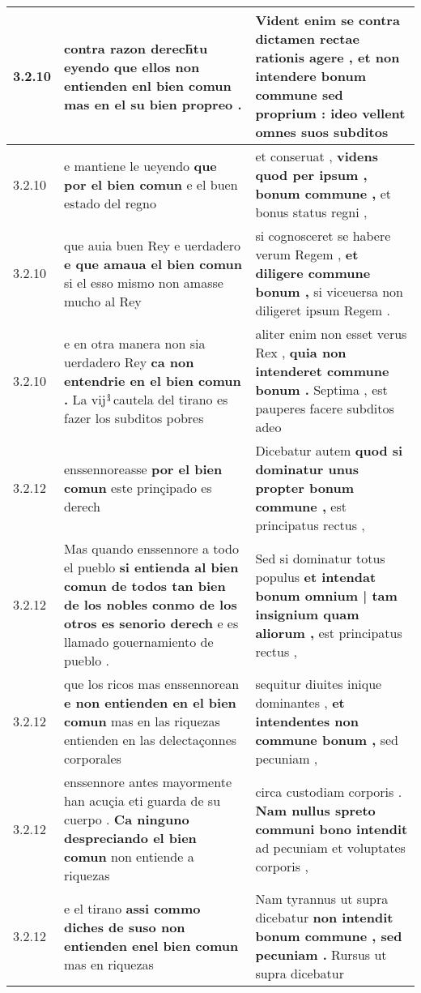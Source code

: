\begin{tabular}{|p{1cm}|p{6.5cm}|p{6.5cm}|}
3.2.10 & contra razon derech̃tu eyendo \textbf{ que ellos non entienden enl bien comun } mas en el su bien propreo . & Vident enim se contra dictamen rectae rationis agere , \textbf{ et non intendere bonum commune sed proprium : } ideo vellent omnes suos subditos \\\hline
3.2.10 & e mantiene le ueyendo \textbf{ que por el bien comun } e el buen estado del regno & et conseruat , \textbf{ videns quod per ipsum , bonum commune , } et bonus status regni , \\\hline
3.2.10 & que auia buen Rey e uerdadero \textbf{ e que amaua el bien comun } si el esso mismo non amasse mucho al Rey & si cognosceret se habere verum Regem , \textbf{ et diligere commune bonum , } si viceuersa non diligeret ipsum Regem . \\\hline
3.2.10 & e en otra manera non sia uerdadero Rey \textbf{ ca non entendrie en el bien comun . } La vij ͣ̊ cautela del tirano es fazer los subditos pobres & aliter enim non esset verus Rex , \textbf{ quia non intenderet commune bonum . } Septima , est pauperes facere subditos adeo \\\hline
3.2.12 & enssennoreasse \textbf{ por el bien comun } este prinçipado es derech & Dicebatur autem \textbf{ quod si dominatur unus propter bonum commune , } est principatus rectus , \\\hline
3.2.12 & Mas quando enssennore a todo el pueblo \textbf{ si entienda al bien comun de todos tan bien de los nobles conmo de los otros es senorio derech } e es llamado gouernamiento de pueblo . & Sed si dominatur totus populus \textbf{ et intendat bonum omnium | tam insignium quam aliorum , } est principatus rectus , \\\hline
3.2.12 & que los ricos mas enssennorean \textbf{ e non entienden en el bien comun } mas en las riquezas entienden en las delectaçonnes corporales & sequitur diuites inique dominantes , \textbf{ et intendentes non commune bonum , } sed pecuniam , \\\hline
3.2.12 & enssennore antes mayormente han acuçia eti guarda de su cuerpo . \textbf{ Ca ninguno despreciando el bien comun } non entiende a riquezas & circa custodiam corporis . \textbf{ Nam nullus spreto communi bono intendit } ad pecuniam et voluptates corporis , \\\hline
3.2.12 & e el tirano \textbf{ assi commo diches de suso non entienden enel bien comun } mas en riquezas & Nam tyrannus ut supra dicebatur \textbf{ non intendit bonum commune , sed pecuniam . } Rursus ut supra dicebatur \\\hline

\end{tabular}
